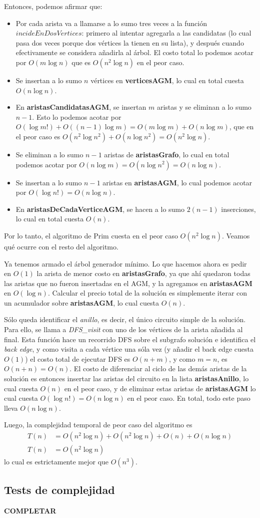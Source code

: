 \noindent Entonces, podemos afirmar que:
\begin{itemize}
\item Por cada arista va a llamarse a lo sumo tres veces a la función $incideEnDosVertices$: primero al intentar agregarla a las candidatas (lo cual pasa dos veces porque dos vértices la tienen en su lista), y después cuando efectivamente se considera añadirla al árbol. El costo total lo podemos acotar por $O(m \log n)$ que es $O(n^2 \log n)$ en el peor caso.
\item Se insertan a lo sumo $n$ vértices en \textbf{verticesAGM}, lo cual en total cuesta $O(n \log n)$.
\item En \textbf{aristasCandidatasAGM}, se insertan $m$ aristas y se eliminan a lo sumo $n-1$. Esto lo podemos acotar por $O(\log m!) + O((n-1)\log m) = O(m \log m) + O(n \log m)$, que en el peor caso es $O(n^2 \log n^2) + O(n \log n^2) = O(n^2 \log n)$.
\item Se eliminan a lo sumo $n - 1$ aristas de \textbf{aristasGrafo}, lo cual en total podemos acotar por $O(n \log m) = O(n \log n^2) = O(n \log n)$.
\item Se insertan a lo sumo $n - 1$ aristas en \textbf{aristasAGM}, lo cual podemos acotar por $O(\log n!) = O(n \log n)$.
\item En \textbf{aristasDeCadaVerticeAGM}, se hacen a lo sumo $2(n-1)$ inserciones, lo cual en total cuesta $O(n)$.
\end{itemize}
Por lo tanto, el algoritmo de Prim cuesta en el peor caso $O(n^2 \log n)$. Veamos qué ocurre con el resto del algoritmo.

Ya tenemos armado el árbol generador mínimo. Lo que hacemos ahora es pedir en $O(1)$ la arista de menor costo en \textbf{aristasGrafo}, ya que ahí quedaron todas las aristas que no fueron insertadas en el AGM, y la agregamos en \textbf{aristasAGM} en $O(\log n)$. Calcular el precio total de la solución es simplemente iterar con un acumulador sobre \textbf{aristasAGM}, lo cual cuesta $O(n)$.

Sólo queda identificar el \emph{anillo}, es decir, el único circuito simple de la solución. Para ello, se llama a \emph{DFS\_visit} con uno de los vértices de la arista añadida al final. Esta función hace un recorrido DFS sobre el subgrafo solución e identifica el \emph{back edge}, y como visita a cada vértice una sóla vez (y añadir el back edge cuesta $O(1)$) el costo total de ejecutar DFS es $O(n + m)$\cite[p.~606]{cormen}, y como $m = n$, es $O(n + n) = O(n)$. El costo de diferenciar al ciclo de las demás aristas de la solución es entonces insertar las aristas del circuito en la lista \textbf{aristasAnillo}, lo cual cuesta $O(n)$ en el peor caso, y de eliminar estas aristas de \textbf{aristasAGM} lo cual cuesta $O(\log n!) = O(n \log n)$ en el peor caso. En total, todo este paso lleva $O(n \log n)$.

Luego, la complejidad temporal de peor caso del algoritmo es 
\begin{align*}
T(n) &= O(n^2 \log n) + O(n^2 \log n) + O(n) + O(n \log n) \\
T(n) &= O(n^2 \log n)
\end{align*}
lo cual es estrictamente mejor que $O(n^3)$.

\subsection{Tests de complejidad}

\textbf{COMPLETAR}
